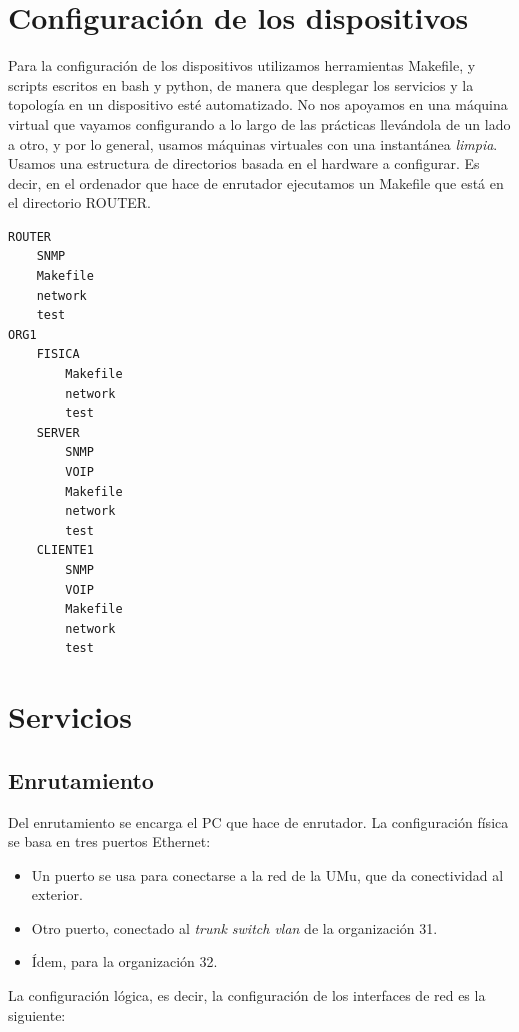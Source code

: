 \documentclass[]{article}
\begin{document}
\section{Configuración de los dispositivos}

Para la configuración de los dispositivos utilizamos herramientas Makefile, y scripts escritos en bash y python, de manera que desplegar los servicios y la topología en un dispositivo esté automatizado. No nos apoyamos en una máquina virtual que vayamos configurando a lo largo de las prácticas llevándola de un lado a otro, y por lo general, usamos máquinas virtuales con una instantánea \textit{limpia}.
\\

Usamos una estructura de directorios basada en el hardware a configurar. Es decir, en el ordenador que hace de enrutador ejecutamos un Makefile que está en el directorio ROUTER.

\begin{Verbatim} 
ROUTER
	SNMP
	Makefile
	network
	test
ORG1
	FISICA
		Makefile
		network
		test
	SERVER
		SNMP
		VOIP
		Makefile
		network
		test
	CLIENTE1
		SNMP
		VOIP
		Makefile
		network
		test

\end{Verbatim}

\section{Servicios}

\subsection{Enrutamiento}

Del enrutamiento se encarga el PC que hace de enrutador. La configuración física se basa en tres puertos Ethernet:

\begin{itemize}
	\item Un puerto se usa para conectarse a la red de la UMu, que da conectividad al exterior. 
	\item Otro puerto, conectado al \textit{trunk switch vlan} de la organización 31.
	\item Ídem, para la organización 32.
\end{itemize}

La configuración lógica, es decir, la configuración de los interfaces de red es la siguiente:
\end{document}
